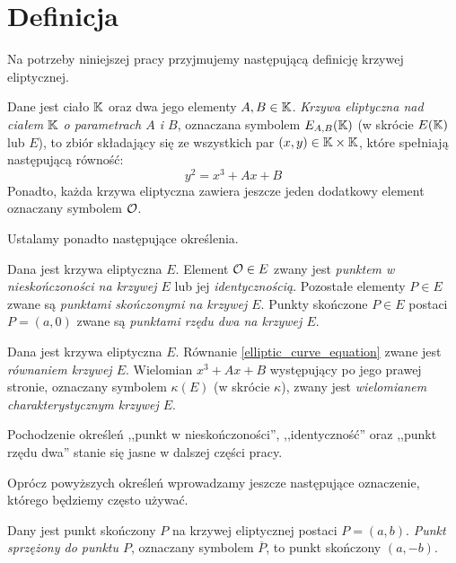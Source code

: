 \section{Definicja}

Na potrzeby niniejszej pracy przyjmujemy
następującą definicję krzywej eliptycznej.

\begin{definition}\label{elliptic_curve_definition}
Dane jest ciało $\mathbb{K}$ oraz dwa jego elementy $A, B \in \mathbb{K}$.
\emph{Krzywa eliptyczna nad ciałem $\mathbb{K}$ o parametrach $A$ i $B$},
oznaczana symbolem $E_{A,B}(\mathbb{K})$ (w skrócie $E(\mathbb{K})$ lub $E$),
to zbiór składający się
ze wszystkich par $(x, y) \in \mathbb{K} \times \mathbb{K}$,
które spełniają następującą równość:
\begin{equation}\label{elliptic_curve_equation}
y^2 = x^3 + Ax + B
\end{equation}
Ponadto, każda krzywa eliptyczna zawiera jeszcze jeden dodatkowy element
oznaczany symbolem $\mathcal{O}$.
\end{definition}

Ustalamy ponadto następujące określenia.

\begin{definition}
Dana jest krzywa eliptyczna $E$.
Element $\mathcal{O} \in E$ zwany jest
\emph{punktem w nieskończoności na krzywej $E$} lub jej \emph{identycznością}.
Pozostałe elementy $P \in E$
zwane są \emph{punktami skończonymi na krzywej $E$}.
Punkty skończone $P \in E$ postaci $P = (a, 0)$
zwane są \emph{punktami rzędu dwa na krzywej $E$}.
\end{definition}

\begin{definition}
Dana jest krzywa eliptyczna $E$.
Równanie \ref{elliptic_curve_equation} zwane jest \emph{równaniem krzywej $E$}.
Wielomian $x^3 + Ax + B$ występujący po jego prawej stronie,
oznaczany symbolem $\kappa(E)$ (w skrócie $\kappa$),
zwany jest \emph{wielomianem charakterystycznym krzywej $E$}.
\end{definition}

Pochodzenie określeń
,,punkt w nieskończoności'', ,,identyczność'' oraz ,,punkt rzędu dwa''
stanie się jasne w dalszej części pracy.

Oprócz powyższych określeń
wprowadzamy jeszcze następujące oznaczenie,
którego będziemy często używać.

\begin{definition}
Dany jest punkt skończony $P$ na krzywej eliptycznej postaci $P = (a, b)$.
\emph{Punkt sprzężony do punktu $P$},
oznaczany symbolem $\overline{P}$,
to punkt skończony $(a, -b)$.
\end{definition}

